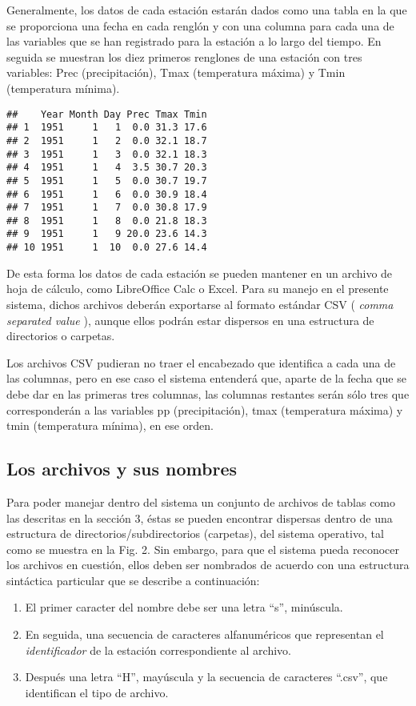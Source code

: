 \documentclass[spanish,]{article}
\providecommand{\tightlist}{%
  \setlength{\itemsep}{0pt}\setlength{\parskip}{0pt}}
\begin{document}
Generalmente, los datos de cada estación estarán dados como una tabla en
la que se proporciona una fecha en cada renglón y con una columna para
cada una de las variables que se han registrado para la estación a lo
largo del tiempo. En seguida se muestran los diez primeros renglones de
una estación con tres variables: Prec (precipitación), Tmax (temperatura
máxima) y Tmin (temperatura mínima).

\begin{verbatim}
##    Year Month Day Prec Tmax Tmin
## 1  1951     1   1  0.0 31.3 17.6
## 2  1951     1   2  0.0 32.1 18.7
## 3  1951     1   3  0.0 32.1 18.3
## 4  1951     1   4  3.5 30.7 20.3
## 5  1951     1   5  0.0 30.7 19.7
## 6  1951     1   6  0.0 30.9 18.4
## 7  1951     1   7  0.0 30.8 17.9
## 8  1951     1   8  0.0 21.8 18.3
## 9  1951     1   9 20.0 23.6 14.3
## 10 1951     1  10  0.0 27.6 14.4
\end{verbatim}

De esta forma los datos de cada estación se pueden mantener en un
archivo de hoja de cálculo, como LibreOffice Calc o Excel. Para su
manejo en el presente sistema, dichos archivos deberán exportarse al
formato estándar CSV ( \emph{comma separated value} ), aunque ellos
podrán estar dispersos en una estructura de directorios o carpetas.

Los archivos CSV pudieran no traer el encabezado que identifica a cada
una de las columnas, pero en ese caso el sistema entenderá que, aparte
de la fecha que se debe dar en las primeras tres columnas, las columnas
restantes serán sólo tres que corresponderán a las variables pp
(precipitación), tmax (temperatura máxima) y tmin (temperatura mínima),
en ese orden.

\subsection{Los archivos y sus
nombres}\label{los-archivos-y-sus-nombres}

Para poder manejar dentro del sistema un conjunto de archivos de tablas
como las descritas en la sección 3, éstas se pueden encontrar dispersas
dentro de una estructura de directorios/subdirectorios (carpetas), del
sistema operativo, tal como se muestra en la Fig. 2. Sin embargo, para
que el sistema pueda reconocer los archivos en cuestión, ellos deben ser
nombrados de acuerdo con una estructura sintáctica particular que se
describe a continuación:

\begin{enumerate}
\def\labelenumi{\arabic{enumi}.}
\tightlist
\item
  El primer caracter del nombre debe ser una letra ``s'', minúscula.
\item
  En seguida, una secuencia de caracteres alfanuméricos que representan
  el \emph{identificador} de la estación correspondiente al archivo.
\item
  Después una letra ``H'', mayúscula y la secuencia de caracteres
  ``.csv'', que identifican el tipo de archivo.
\end{enumerate}
\end{document}
